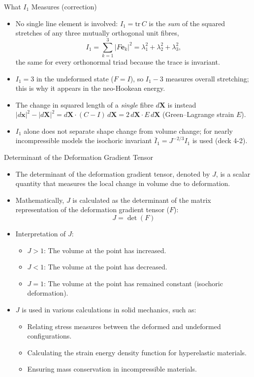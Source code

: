 \documentclass{beamer}
\begin{document}
\begin{frame}{What $I_1$ Measures (correction)}
\begin{itemize}
\item No single line element is involved: $I_1 = \mathrm{tr}\,C$ is the \emph{sum} of the squared stretches of any three mutually orthogonal unit fibres,
\begin{equation*}
I_1 = \sum_{k=1}^{3} |F\mathbf{e}_k|^2 = \lambda_1^2+\lambda_2^2+\lambda_3^2 ,
\end{equation*}
the same for every orthonormal triad because the trace is invariant.
\item $I_1 = 3$ in the undeformed state ($F = I$), so $I_1 - 3$ measures overall stretching; this is why it appears in the neo-Hookean energy.
\item The change in squared length of a \emph{single} fibre $d\mathbf{X}$ is instead $|d\mathbf{x}|^2 - |d\mathbf{X}|^2 = d\mathbf{X}\cdot(C-I)\,d\mathbf{X} = 2\,d\mathbf{X}\cdot E\,d\mathbf{X}$ (Green--Lagrange strain $E$).
\item $I_1$ alone does not separate shape change from volume change; for nearly incompressible models the isochoric invariant $\bar I_1 = J^{-2/3}I_1$ is used (deck 4-2).
\end{itemize}
\end{frame}

\begin{frame}{Determinant of the Deformation Gradient Tensor}
\begin{itemize}
\item The determinant of the deformation gradient tensor, denoted by $J$, is a scalar quantity that measures the local change in volume due to deformation.
\item Mathematically, $J$ is calculated as the determinant of the matrix representation of the deformation gradient tensor ($F$):
\begin{equation*}
J = \det(F)
\end{equation*}
\item Interpretation of $J$:
\begin{itemize}
\item $J > 1$: The volume at the point has increased.
\item $J < 1$: The volume at the point has decreased.
\item $J = 1$: The volume at the point has remained constant (isochoric deformation).
\end{itemize}
\item $J$ is used in various calculations in solid mechanics, such as:
\begin{itemize}
\item Relating stress measures between the deformed and undeformed configurations.
\item Calculating the strain energy density function for hyperelastic materials.
\item Ensuring mass conservation in incompressible materials.
\end{itemize}
\end{itemize}
\end{frame}
\end{document}
